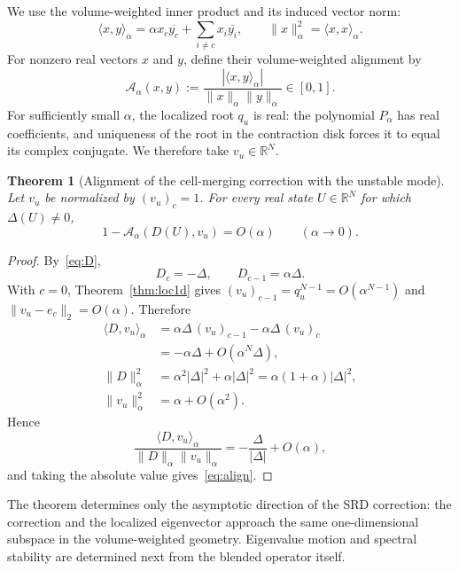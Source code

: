 \documentclass[preprint,12pt]{elsarticle}
\newtheorem{theorem}{Theorem}[section]
\begin{document}
We use the volume-weighted inner product and its induced vector norm:
\begin{equation}
    \langle x,y\rangle_\alpha
    =
    \alpha x_c\overline{y_c}
    +
    \sum_{i\ne c}x_i\overline{y_i},
    \qquad
    \|x\|_\alpha^2=\langle x,x\rangle_\alpha.
    \label{eq:ip}
\end{equation}
For nonzero real vectors $x$ and $y$, define their volume-weighted alignment
by
\begin{equation}
    \mathcal A_\alpha(x,y)
    :=
    \frac{|\langle x,y\rangle_\alpha|}
         {\|x\|_\alpha\|y\|_\alpha}
    \in[0,1].
    \label{eq:alignment-def}
\end{equation}
For sufficiently small $\alpha$, the localized root $q_u$ is real: the
polynomial $P_\alpha$ has real coefficients, and uniqueness of the root in the
contraction disk forces it to equal its complex conjugate.  We therefore take
$v_u\in\mathbb R^N$.

\begin{theorem}[Alignment of the cell-merging correction with the unstable mode]
\label{thm:align}
Let $v_u$ be normalized by $(v_u)_c=1$.  For every real state
$U\in\mathbb R^N$ for which $\Delta(U)\ne0$,
\begin{equation}
    1-\mathcal A_\alpha(D(U),v_u)=O(\alpha)
    \qquad (\alpha\to0).
    \label{eq:align}
\end{equation}
\end{theorem}

\begin{proof}
By~\eqref{eq:D},
\[
 D_c=-\Delta,\qquad D_{c-1}=\alpha\Delta.
\]
With $c=0$, Theorem~\ref{thm:loc1d} gives
$(v_u)_{c-1}=q_u^{N-1}=O(\alpha^{N-1})$ and
$\|v_u-e_c\|_2=O(\alpha)$.  Therefore
\begin{align*}
 \langle D,v_u\rangle_\alpha
 &=
 \alpha\Delta\,(v_u)_{c-1}
 -\alpha\Delta\,(v_u)_c\\
 &=
 -\alpha\Delta+O(\alpha^N\Delta),
\\
 \|D\|_\alpha^2
 &=
 \alpha^2|\Delta|^2+\alpha|\Delta|^2
 =
 \alpha(1+\alpha)|\Delta|^2,
\\
 \|v_u\|_\alpha^2
 &=
 \alpha+O(\alpha^2).
\end{align*}
Hence
\[
 \frac{\langle D,v_u\rangle_\alpha}
      {\|D\|_\alpha\|v_u\|_\alpha}
 =-\frac{\Delta}{|\Delta|}+O(\alpha),
\]
and taking the absolute value gives~\eqref{eq:align}.
\end{proof}

The theorem determines only the asymptotic direction of the SRD correction:
the correction and the localized eigenvector approach the same one-dimensional
subspace in the volume-weighted geometry.  Eigenvalue motion and spectral
stability are determined next from the blended operator itself.
\end{document}
